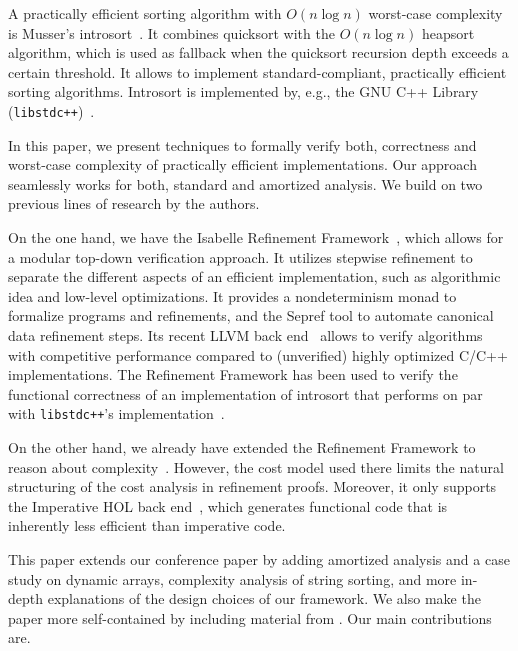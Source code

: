 \documentclass[acmsmall]{acmart}
\newcommand{\is}{\lstinline[language=isabelle]}
\begin{document}
A practically efficient sorting algorithm with $O(n\log n)$ worst-case complexity is Musser's introsort~\cite{Musser97}. It combines quicksort with the
$O(n\log n)$ heapsort algorithm, which is used as fallback when the quicksort recursion depth exceeds a certain threshold. It allows to implement standard-compliant, practically efficient sorting algorithms. Introsort is implemented by, e.g., the GNU C++ Library (\is{libstdc++})~\cite{libstdc++}.


In this paper, we present techniques to formally verify both, correctness and worst-case complexity of practically efficient implementations.
Our approach seamlessly works for both, standard and amortized analysis.
We build on two previous lines of research by the authors. 

On the one hand, we have the Isabelle Refinement Framework~\cite{lammich2012applying}, which allows for a modular top-down verification approach. It utilizes stepwise refinement to separate the different aspects of an efficient implementation, such as algorithmic idea and low-level optimizations. 
It provides a nondeterminism monad to formalize programs and refinements, and the Sepref tool to automate canonical data refinement steps.
Its recent LLVM back end~\cite{lammich2019LLVM} allows to verify algorithms with competitive performance compared to (unverified) highly optimized C/C++ implementations. 
The Refinement Framework has been used to verify the functional correctness of an implementation of introsort that performs on par with \is{libstdc++}'s implementation~\cite{Lammich20}.

On the other hand, we already have extended the Refinement Framework to reason about complexity~\cite{HaslbeckL19}.
However, the cost model used there limits the natural structuring of the cost analysis in refinement proofs. Moreover, it only supports the Imperative HOL back end~\cite{Lammich19_JAR}, which generates functional code that is inherently less efficient than imperative code.

This paper extends our conference paper \cite{HaslbeckL21} by adding amortized analysis and a case study on dynamic arrays, complexity analysis of string sorting, and more in-depth explanations of the design choices of our framework. We also make the paper more self-contained by including material from \cite{HaslbeckL19}.
Our main contributions are.
\end{document}
